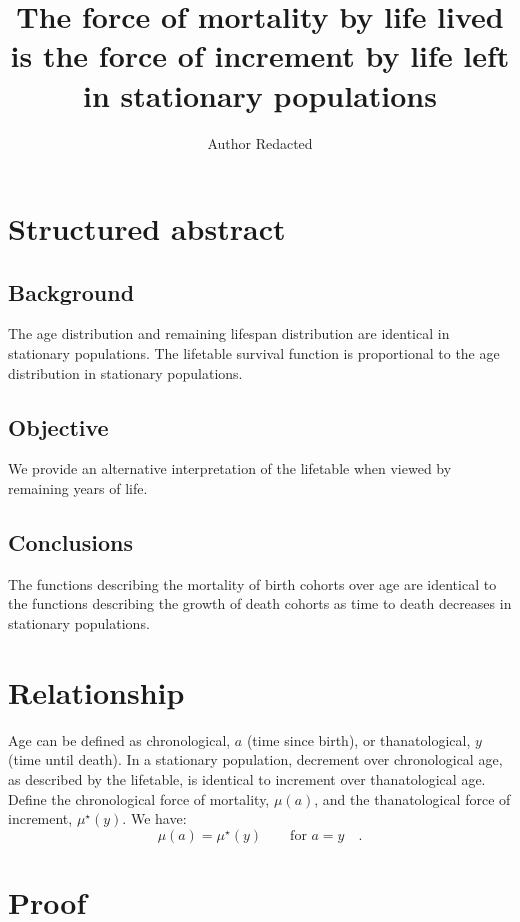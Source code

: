 \documentclass{article}
\begin{document}
\title{The force of mortality by life lived is the force of increment by life
left in stationary populations}
\author{Author Redacted}
\maketitle
\section*{Structured abstract}

\subsection*{Background}
The age distribution and remaining lifespan distribution are identical in
stationary populations. The lifetable survival function is proportional to the
age distribution in stationary populations.

\subsection*{Objective}
We provide an alternative interpretation of the lifetable when viewed by
remaining years of life.

\subsection*{Conclusions}
The functions describing the mortality of birth cohorts over age are identical
to the functions describing the growth of death cohorts as time to death decreases in stationary populations.
\vspace{2cm}
\section*{Relationship}

Age can be defined as chronological, $a$ (time since birth), or thanatological,
$y$ (time until death). In a stationary population, decrement over
chronological age, as described by the lifetable, is
identical to increment over thanatological age. Define the chronological force
of mortality, $\mu(a)$, and the thanatological force of increment,
$\mu^\star(y)$. We have:
\begin{equation}
\mu(a) = \mu^\star(y)\quad\quad\text{for~}a=y\quad \text{.}
\end{equation}

\section*{Proof}
\end{document}
